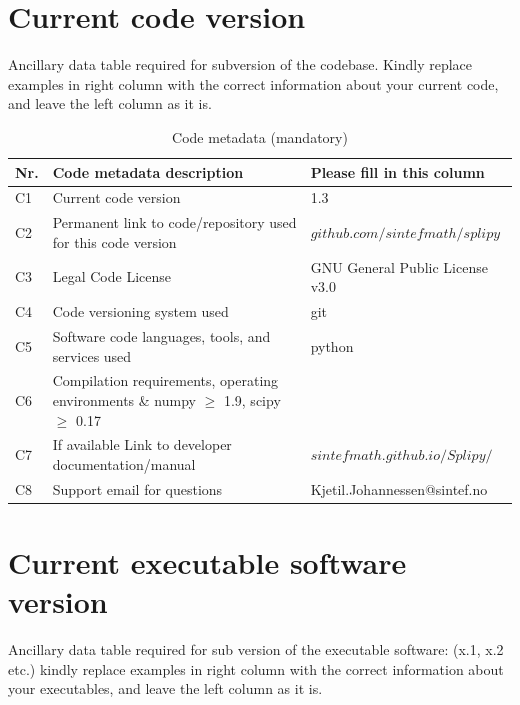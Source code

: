 \documentclass[preprint,12pt, a4paper]{elsarticle}
\begin{document}
\section*{Current code version}
\label{}

Ancillary data table required for subversion of the codebase. Kindly replace examples in right column with the correct information about your current code, and leave the left column as it is.

\begin{table}[!h]
\begin{tabular}{|l|p{6.5cm}|p{6.5cm}|}
\hline
\textbf{Nr.} & \textbf{Code metadata description} & \textbf{Please fill in this column} \\
\hline
C1 & Current code version & 1.3 \\
\hline
C2 & Permanent link to code/repository used for this code version & $github.com/sintefmath/splipy$ \\
\hline
C3 & Legal Code License   & GNU General Public License v3.0  \\
\hline
C4 & Code versioning system used & git \\
\hline
C5 & Software code languages, tools, and services used & python \\
\hline
C6 & Compilation requirements, operating environments \& numpy $\geq$ 1.9, scipy $\geq$ 0.17 \\
\hline
C7 & If available Link to developer documentation/manual & $sintefmath.github.io/Splipy/$ \\
\hline
C8 & Support email for questions & Kjetil.Johannessen@sintef.no \\
\hline
\end{tabular}
\caption{Code metadata (mandatory)}
\label{} 
\end{table}

\section*{Current executable software version}
\label{}

Ancillary data table required for sub version of the executable software: (x.1, x.2 etc.) kindly replace examples in right column with the correct information about your executables, and leave the left column as it is.
\end{document}
